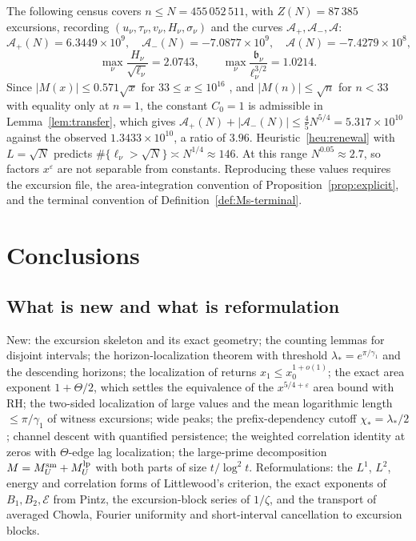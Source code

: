 \documentclass[11pt]{amsart}
\numberwithin{equation}{section}
\theoremstyle{plain}
\theoremstyle{definition}
\theoremstyle{remark}
\newcommand{\Ap}{\mathcal{A}_{+}}
\newcommand{\Am}{\mathcal{A}_{-}}
\newcommand{\Anet}{\mathcal{A}}
\newcommand{\eps}{\varepsilon}
\newcommand{\En}{\mathcal{E}}
\begin{document}
The following census covers $n\le N=455\,052\,511$, with $Z(N)=87\,385$
excursions, recording $(u_\nu,\tau_\nu,v_\nu,H_\nu,\sigma_\nu)$ and the
curves $\Ap,\Am,\Anet$:
\begin{equation}
\label{eq:census_values}
  \Ap(N)=6.3449\times10^9,\quad \Am(N)=-7.0877\times10^9,\quad
  \Anet(N)=-7.4279\times10^8,
\end{equation}
\begin{equation}
\label{eq:census_max}
  \max_\nu\frac{H_\nu}{\sqrt{\ell_\nu}}=2.0743,\qquad
  \max_\nu\frac{\mathfrak b_\nu}{\ell_\nu^{3/2}}=1.0214 .
\end{equation}
Since $|M(x)|\le0.571\sqrt x$ for $33\le x\le10^{16}$ \cite{Hurst18}, and
$|M(n)|\le\sqrt n$ for $n<33$ with equality only at $n=1$, the
constant $C_0=1$ is admissible in Lemma~\ref{lem:transfer}, which gives
$\Ap(N)+|\Am(N)|\le\frac45N^{5/4}=5.317\times10^{10}$ against the observed
$1.3433\times10^{10}$, a ratio of $3.96$. Heuristic~\ref{heu:renewal} with
$L=\sqrt N$ predicts $\#\{\ell_\nu>\sqrt N\}\asymp N^{1/4}\approx146$. At
this range $N^{0.05}\approx2.7$, so factors $x^\eps$ are not separable from
constants. Reproducing these values requires the excursion file, the
area-integration convention of Proposition~\ref{prop:explicit}, and the
terminal convention of Definition~\ref{def:Ms-terminal}.

\section{Conclusions}
\label{sec:conclusions}

\subsection*{What is new and what is reformulation}
New: the excursion skeleton and its exact geometry; the counting lemmas for
disjoint intervals; the horizon-localization theorem with threshold
$\lambda_*=e^{\pi/\gamma_1}$ and the descending horizons; the localization
of returns $x_1\le x_0^{1+o(1)}$; the exact area exponent $1+\Theta/2$, which
settles the equivalence of the $x^{5/4+\eps}$ area bound with RH; the
two-sided localization of large values and the mean logarithmic length
$\le\pi/\gamma_1$ of witness excursions; wide peaks; the prefix-dependency
cutoff $\chi_*=\lambda_*/2$; channel descent with quantified persistence;
the weighted correlation identity at zeros with $\Theta$-edge lag
localization; the large-prime decomposition $M=M^{\rm sm}_U+M^{\rm lp}_U$
with both parts of size $t/\log^2t$. Reformulations: the $L^1$, $L^2$,
energy and correlation forms of Littlewood's criterion, the exact exponents
of $B_1,B_2,\En$ from Pintz, the excursion-block series of $1/\zeta$, and the
transport of averaged Chowla, Fourier uniformity and short-interval
cancellation to excursion blocks.
\end{document}
